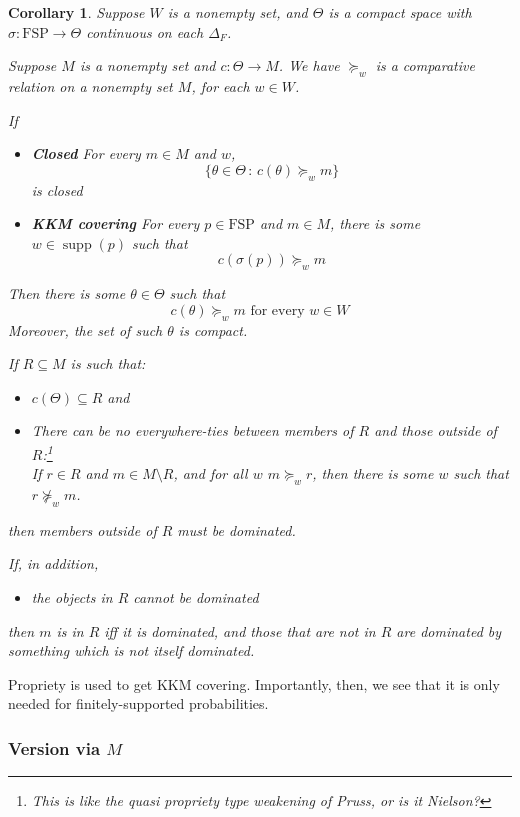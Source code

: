\documentclass[11pt]{article}
\newtheorem{corollary}[theorem]{Corollary}
\theoremstyle{definition}
\theoremstyle{remark}
\newcommand{\supp}{\operatorname{supp}}
\newcommand{\given}{\,:\,}
\newcommand{\FSP}{\mathrm{FSP}}
\begin{document}
\begin{corollary}
	Suppose $W$ is a nonempty set, and $\Theta$ is a compact space with $\sigma:\FSP\to \Theta$ continuous on each $\Delta_F$. 
	
	Suppose $M$ is a nonempty set and $c:\Theta\to M$. We have $\succeq_w$ is a comparative relation on a nonempty set $M$, for each $w\in W$. 
	
	If \begin{itemize}
		\item \textbf{Closed} For every $m\in M$ and $w$, \[\{\theta\in\Theta\given c(\theta)\succeq_w m\}\] is closed
		\item \textbf{KKM covering} For every $p\in \FSP$ and $m\in M$, there is some $w\in\supp(p)$ such that $$c(\sigma(p))\succeq_w m$$
	\end{itemize}
	Then there is some $\theta\in\Theta$ such that 
	\[
	c(\theta)\succeq_w m
	\text{ for every }w\in W
	\] 
	Moreover, the set of such $\theta$ is compact.

	If $R\subseteq M$ is such that:
	\begin{itemize}
		\item $c(\Theta)\subseteq R$ and
		\item There can be no everywhere-ties between members of $R$ and those outside of $R$:\footnote{This is like the quasi propriety type weakening of Pruss, or is it Nielson?} \\
		If $r\in R$ and $m\in M\setminus R$, and for all $w$ $m\succeq_w r$, then there is some $w$ such that $r\not\succeq_w m$.
	\end{itemize}then members outside of $R$ must be dominated. 
	
	If, in addition, \begin{itemize}
		\item the objects in $R$ cannot be dominated
	\end{itemize} then $m$ is in $R$ iff it is dominated, and those that are not in $R$ are dominated by something which is not itself dominated. 
\end{corollary}

Propriety is used to get KKM covering. Importantly, then, we see that it is only needed for finitely-supported probabilities. 



\subsubsection{Version via $M$}
\end{document}
